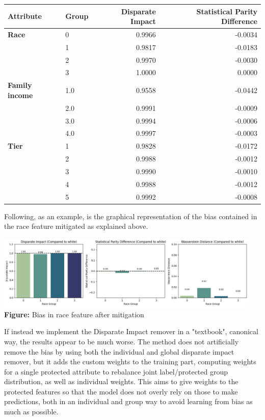 \documentclass{article}
\begin{document}
\begin{center}
\begin{tabular}{llrr} 
\toprule
\textbf{Attribute} & \textbf{Group} & \textbf{Disparate Impact} & \textbf{Statistical Parity Difference} \\
\midrule
\textbf{Race}
& 0 & 0.9966 & -0.0034 \\
& 1 & 0.9817 & -0.0183 \\
& 2 & 0.9970 & -0.0030 \\
& 3 & 1.0000 & 0.0000 \\
\midrule
\textbf{Family income}
& 1.0 & 0.9558 & -0.0442 \\
& 2.0 & 0.9991 & -0.0009 \\
& 3.0 & 0.9994 & -0.0006 \\
& 4.0 & 0.9997 & -0.0003 \\
\midrule
\textbf{Tier}
& 1 & 0.9828 & -0.0172 \\
& 2 & 0.9988 & -0.0012 \\
& 3 & 0.9990 & -0.0010 \\
& 4 & 0.9988 & -0.0012 \\
& 5 & 0.9992 & -0.0008 \\
\bottomrule
\end{tabular}
\end{center}
    

Following, as an example, is the graphical representation of the bias contained in the race feature mitigated as explained above. 
\noindent
\begin{center}
  \includegraphics[width=0.95\textwidth]{raceexamplegood.png}
  \vspace{0.7em}
  \textbf{Figure:} Bias in race feature after mitigation
\end{center}

If instead we implement the Disparate Impact remover in a "textbook", canonical way, the results appear to be much worse. The method does not artificially remove the bias by using both the individual and global disparate impact remover, but it adds the custom weights to the training part, computing weights for a single protected attribute to rebalance joint label/protected group distribution, as well as individual weights. This aims to give weights to the protected features so that the model does not overly rely on those to make predictions, both in an individual and group way to avoid learning from bias as much as possible. 
\end{document}
